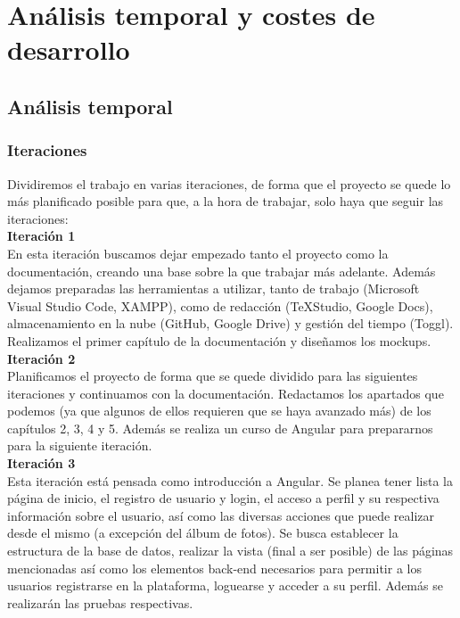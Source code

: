 \chapter{An\'alisis temporal y costes de desarrollo}\label{anatemporal}
\section{An\'alisis temporal}
\subsection{Iteraciones}

Dividiremos el trabajo en varias iteraciones, de forma que el proyecto se quede lo más planificado posible para que, a la hora de trabajar, solo haya que seguir las iteraciones:\\

\textbf{Iteración 1}\\

En esta iteración buscamos dejar empezado tanto el proyecto como la documentación, creando una base sobre la que trabajar más adelante. Además dejamos preparadas las herramientas a utilizar, tanto de trabajo (Microsoft Visual Studio Code, XAMPP), como de redacción (TeXStudio, Google Docs), almacenamiento en la nube (GitHub, Google Drive) y gestión del tiempo (Toggl). Realizamos el primer capítulo de la documentación y diseñamos los mockups.\\

\textbf{Iteración 2}\\

Planificamos el proyecto de forma que se quede dividido para las siguientes iteraciones y continuamos con la documentación. Redactamos los apartados que podemos (ya que algunos de ellos requieren que se haya avanzado más) de los capítulos 2, 3, 4 y 5. Además se realiza un curso de Angular \cite{cursoangular} para prepararnos para la siguiente iteración.\\

\textbf{Iteración 3}\\

Esta iteración está pensada como introducción a Angular. Se planea tener lista la página de inicio, el registro de usuario y login, el acceso a perfil y su respectiva información sobre el usuario, así como las diversas acciones que puede realizar desde el mismo (a excepción del álbum de fotos). Se busca establecer la estructura de la base de datos, realizar la vista (final a ser posible) de las páginas mencionadas así como los elementos back-end necesarios para permitir a los usuarios registrarse en la plataforma, loguearse y acceder a su perfil. Además se realizarán las pruebas respectivas.\\

